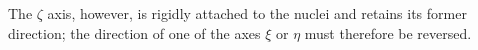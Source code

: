 The $\zeta$ axis, however, is rigidly attached to the nuclei and retains its former direction; the direction of
one of the axes $\xi$ or $\eta$ must therefore be reversed.
